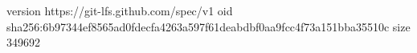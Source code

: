 version https://git-lfs.github.com/spec/v1
oid sha256:6b97344ef8565ad0fdecfa4263a597f61deabdbf0aa9fcc4f73a151bba35510c
size 349692
